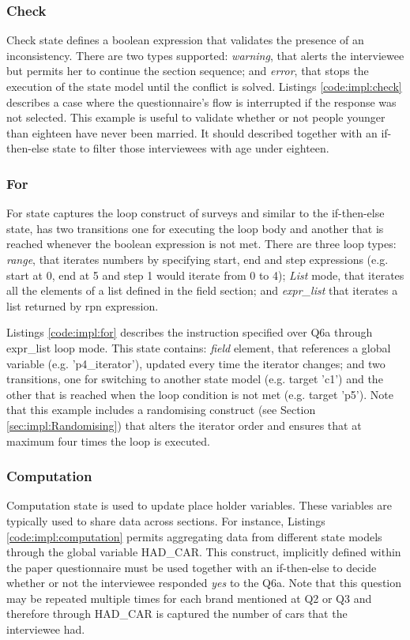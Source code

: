 	\subsubsection{Check}
		Check state defines a boolean expression that validates the presence of an inconsistency. There are two types supported: \emph{warning}, that alerts the interviewee but permits her to continue the section sequence; and \emph{error}, that stops the execution of the state model until the conflict is solved. Listings \ref{code:impl:check} describes a case where the questionnaire's flow is interrupted if the response was not selected. This example is useful to validate whether or not people younger than eighteen have never been married. It should described together with an if-then-else state to filter those interviewees with age under eighteen.
		
	\subsubsection{For}\label{sec:impl:for}
		For state captures the loop construct of surveys and similar to the if-then-else state, has two transitions one for executing the loop body and another that is reached whenever the boolean expression is not met. There are three loop types: \emph{range}, that iterates numbers by specifying start, end and step expressions (e.g. start at 0, end at 5 and step 1 would iterate from 0 to 4); \emph{List} mode, that iterates all the elements of a list defined in the field section; and \emph{expr\_list} that iterates a list returned by \gls{rpn} expression.
		
		Listings \ref{code:impl:for} describes the instruction specified over Q6a through expr\_list loop mode. This state contains: \emph{field} element, that references a global variable (e.g. 'p4\_iterator'), updated every time the iterator changes; and two transitions, one for switching to another state model (e.g. target 'c1') and the other that is reached when the loop condition is not met (e.g. target 'p5'). Note that this example includes a randomising construct (see Section \ref{sec:impl:Randomising}) that alters the iterator order and ensures that at maximum four times the loop is executed.
		
	\subsubsection{Computation}
		Computation state is used to update place holder variables. These variables are typically used to share data across sections. For instance, Listings \ref{code:impl:computation} permits aggregating data from different state models through the global variable HAD\_CAR. This construct, implicitly defined within the paper questionnaire must be used together with an if-then-else to decide whether or not the interviewee responded \emph{yes} to the Q6a. Note that this question may be repeated multiple times for each brand mentioned at Q2 or Q3 and therefore through HAD\_CAR is captured the number of cars that the interviewee had.
 		
	